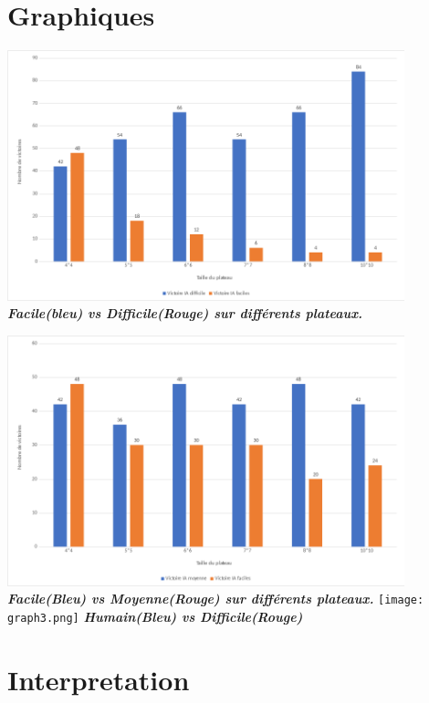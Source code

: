 \documentclass{report}
\begin{document}
\section{Graphiques}
\begin{center}
  \includegraphics[width=11.5cm]{graph1.png}
  \newline
\textbf{\textit{Facile(bleu) vs Difficile(Rouge) sur différents plateaux.}}
  \newline
  
  \includegraphics[width=11.5cm]{graph2.png}
  \newline
\textbf{\textit{Facile(Bleu) vs Moyenne(Rouge) sur différents plateaux.}}
  \texttt{[image: graph3.png]}
  \newline
\textbf{\textit{Humain(Bleu) vs Difficile(Rouge)}}
\end{center}


\section{Interpretation}
\end{document}
